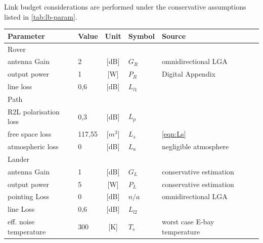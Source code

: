 Link budget considerations are performed under the conservative assumptions listed in \autoref{tab:lb-param}. \\

\begin{table}[h]
\centering
\begin{tabular}{llclll}
\hline
Parameter                        & Value  & Unit	       & Symbol        & Source                       &  \\ \hline
Rover                            &        &            &               &                              &  \\ \hline\hline
antenna Gain           		     & 2      & {[}dB{]}   & ${G}_{R}$  	   & omnidirectional LGA          &  \\
output power        	         & 1      & {[}W{]}    & ${P}_{R}$  	   & Digital Appendix                            &  \\
line loss               	     & 0,6    & {[}dB{]}   & ${L}_{l1}$ 	   & \cite{FLP_Exercise}                          &  \\ \hline
Path                             &        &            &               &                              &  \\ \hline\hline
R2L polarisation loss            & 0,3    & {[}dB{]}   & ${L}_{p}$ 	   & \cite{FLP_Exercise}                          &  \\
free space loss                  & 117,55 & {[}$m^3${]}& ${L}_{s}$  	   & \autoref{eqn:Ls}                             &  \\
atmospheric loss                 & 0      & {[}dB{]}   & ${L}_{a}$	   & negligible atmosphere        &  \\ \hline
Lander                           &        &            &               &                              &  \\ \hline\hline
antenna Gain             		 & 1      & {[}dB{]}   & ${G}_{L}$	   & conservative estimation      &  \\
output power        	         & 5      & {[}W{]}    & ${P}_{L}$  	   & conservative estimation      &  \\
pointing Loss  		             & 0      & {[}dB{]}   & ${n/a}$       & omnidirectional LGA          &  \\
line Loss  		                 & 0,6    & {[}dB{]}   & ${L}_{l2}$	   & \cite{FLP_Exercise}                          &  \\
eff. noise temperature           & 300    & {[}K{]}    & ${T}_{s}$	   & worst case E-bay temperature &  \\ \hline

\end{tabular}
\end{table}
